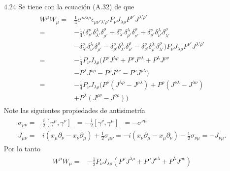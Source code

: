 \documentclass{article}
\begin{document}
\begin{enumerate}
\item[4.24] Se tiene con la ecuación (A.32) de \cite{Lahiri2005} que
\begin{align}
\begin{split}
W^\mu W_\mu=&\frac{1}{4}\epsilon^{\mu\nu\lambda\rho}\epsilon_{\mu\nu'\lambda'\rho'}P_\nu J_{\lambda\rho}P^{\nu'} J^{\lambda'\rho'}\\
=&-\frac{1}{4}(\delta^\nu_{\nu'}\delta^\lambda_{\lambda'}\delta^\rho_{\rho'}+\delta^\nu_{\lambda'}\delta^\lambda_{\rho'}\delta^\rho_{\nu'}+\delta^\nu_{\rho'}\delta^\lambda_{\nu'}\delta^\rho_{\lambda'}\\
&-\delta^\nu_{\lambda'}\delta^\lambda_{\nu'}\delta^\rho_{\rho'}-\delta^\nu_{\rho'}\delta^\lambda_{\lambda'}\delta^\rho_{\nu'}-\delta^\nu_{\nu'}\delta^\lambda_{\rho'}\delta^\rho_{\lambda'})P_\nu J_{\lambda\rho}P^{\nu'} J^{\lambda'\rho'}\\
=&-\frac{1}{4}P_\nu J_{\lambda\rho}(P^{\nu} J^{\lambda\rho}+P^{\rho} J^{\nu\lambda}+P^{\lambda} J^{\rho\nu}\\
&-P^{\lambda} J^{\nu\rho}-P^{\rho} J^{\lambda\nu}-P^{\nu} J^{\rho\lambda})\\
=&-\frac{1}{4}P_\nu J_{\lambda\rho}(P^{\nu} (J^{\lambda\rho}-J^{\rho\lambda})+P^{\rho} (J^{\nu\lambda}-J^{\lambda\nu})\\
&+P^{\lambda} (J^{\rho\nu}-J^{\nu\rho}))
\end{split}
\end{align}
Note las siguientes propiedades de antisimetría
\begin{align}
\begin{split}
\sigma_{\mu\nu}=&\frac{i}{2}[\gamma^\mu,\gamma^\nu]_-=-\frac{i}{2}[\gamma^\nu,\gamma^\mu]_-=-\sigma^{\nu\mu}\\
J_{\mu\nu}=&i(x_\mu\partial_\nu-x_\nu\partial_\mu)+\frac{1}{2}\sigma_{\mu\nu}=-i(x_\nu\partial_\mu-x_\mu\partial_\nu)-\frac{1}{2} \sigma_{\nu\mu}=-J_{\nu\mu}.
\end{split}
\end{align}
Por lo tanto
\begin{align}
\begin{split}
W^\mu W_\mu=&-\frac{1}{2}P_\nu J_{\lambda\rho}(P^{\nu} J^{\lambda\rho}+P^{\rho} J^{\nu\lambda}+P^{\lambda} J^{\rho\nu})
\end{split}
\end{align}

\end{enumerate}



\end{document}
